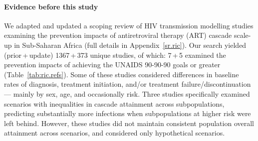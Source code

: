 \newcommand{\pu}[2]{#1\,+\,#2}
\begin{ric} %
  \paragraph{Evidence before this study}
  We adapted and updated a scoping review of HIV transmission modelling studies examining
  the prevention impacts of antiretroviral therapy (ART) cascade scale-up in Sub-Saharan Africa
  (full details in Appendix~\ref{sr.ric}).
  Our search yielded (\pu{prior}{update}) \pu{1367}{373} unique studies, of which:
  \pu{7}{5} examined the prevention impacts of achieving
  the UNAIDS 90-90-90 goals or greater (Table~\ref{tab:ric.refs}).
  Some of these studies considered differences in baseline rates of
  diagnosis, treatment initiation, and/or treatment failure/discontinuation
  --- mainly by sex, age, and occasionally risk.
  Three studies specifically examined scenarios with inequalities in cascade attainment across subpopulations,
  predicting substantially more infections when subpopulations at higher risk were left behind.
  However, these studies did not maintain consistent population overall attainment across scenarios, %
  and considered only hypothetical scenarios. 

\end{ric}
